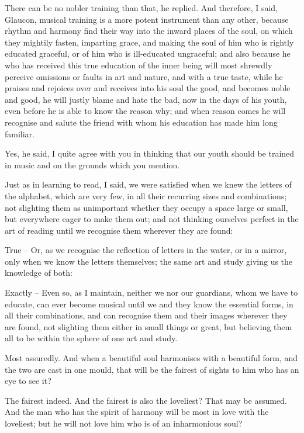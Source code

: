 There can be no nobler training than that, he replied.
And therefore, I said, Glaucon, musical training is a more potent instrument than any other, because rhythm and harmony find their way into the inward places of the soul, on which they mightily fasten, imparting grace, and making the soul of him who is rightly educated graceful, or of him who is ill-educated ungraceful; and also because he who has received this true education of the inner being will most shrewdly perceive omissions or faults in art and nature, and with a true taste, while he praises and rejoices over and receives into his soul the good, and becomes noble and good, he will justly blame and hate the bad, now in the days of his youth, even before he is able to know the reason why; and when reason comes he will recognise and salute the friend with whom his education has made him long familiar.

Yes, he said, I quite agree with you in thinking that our youth should be trained in music and on the grounds which you mention.

Just as in learning to read, I said, we were satisfied when we knew the letters of the alphabet, which are very few, in all their recurring sizes and combinations; not slighting them as unimportant whether they occupy a space large or small, but everywhere eager to make them out; and not thinking ourselves perfect in the art of reading until we recognise them wherever they are found:

True --
Or, as we recognise the reflection of letters in the water, or in a mirror, only when we know the letters themselves; the same art and study giving us the knowledge of both:

Exactly --
Even so, as I maintain, neither we nor our guardians, whom we have to educate, can ever become musical until we and they know the essential forms, in all their combinations, and can recognise them and their images wherever they are found, not slighting them either in small things or great, but believing them all to be within the sphere of one art and study.

Most assuredly.
And when a beautiful soul harmonises with a beautiful form, and the two are cast in one mould, that will be the fairest of sights to him who has an eye to see it?

The fairest indeed.
And the fairest is also the loveliest?
That may be assumed.
And the man who has the spirit of harmony will be most in love with the loveliest; but he will not love him who is of an inharmonious soul?

